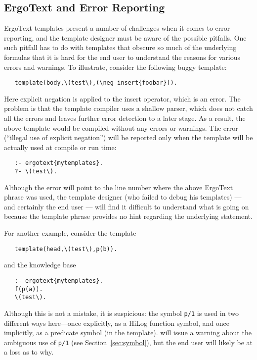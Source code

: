 \subsection{ErgoText and Error Reporting}

ErgoText templates present a number of challenges when it comes to error
reporting, and the template designer must be aware of the possible
pitfalls. One such pitfall has to do with templates that obscure so much of the
underlying \FLSYSTEM formulas that it is hard for the end user to
understand the reasons for various errors and warnings.
To illustrate, consider the following buggy template:
\begin{verbatim}
   template(body,\(test\),(\neg insert{foobar})). 
\end{verbatim}
Here explicit negation is applied to the insert operator, which is an error.
The problem is that the template compiler uses a shallow parser, which does
not catch all the errors and leaves further error detection to a later
stage. As a result, the above template would be compiled without
any errors or warnings. The error (``illegal use of explicit negation'')
will be reported
only when the template will be actually used at compile or run time:
\begin{verbatim}
   :- ergotext{mytemplates}. 
   ?- \(test\).
\end{verbatim}
Although the
error will point to the line number where the above ErgoText phrase was
used, the template designer (who failed
to debug his templates) --- and certainly the end user --- will find it
difficult to
understand what is going on because the template phrase provides no hint
regarding the underlying \FLSYSTEM statement.

For another example, consider the template
\begin{verbatim}
   template(head,\(test\),p(b)).
\end{verbatim}
and the knowledge base 
\begin{verbatim}
   :- ergotext{mytemplates}. 
   f(p(a)).
   \(test\).
\end{verbatim}
Although this is not a mistake, it is suspicious: the symbol \texttt{p/1} is used in two
different ways here---once explicitly, as a HiLog function symbol, and once
implicitly,
as a predicate symbol (in the template). \FLSYSTEM will issue a warning
about the ambiguous use of \texttt{p/1}  (see Section~\ref{sec:symbol}),
but the end user will likely be at a loss as to why.


